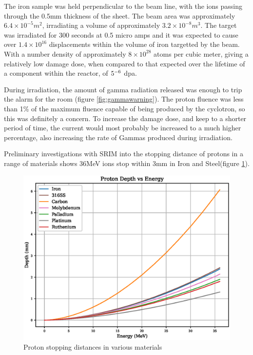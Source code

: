 The iron sample was held perpendicular to the beam line, with the ions passing through the 0.5mm thickness of the sheet.  The beam area was approximately $6.4 \times 10^{-5} m^2$, irradiating a volume of approximately $3.2 \times 10^{-8} m^3$.  The target was irradiated for 300 seconds at 0.5 micro amps and it was expected to cause over $1.4 \times 10^{16}$ displacements within the volume of iron targetted by the beam.  With a number density of approximately $8\times10^{28}$ atoms per cubic meter, giving a relatively low damage dose, when compared to that expected over the lifetime of a component within the reactor, of $5 \time 10^{-6}$ \acrshort{dpa}.

During irradiation, the amount of gamma radiation released was enough to trip the alarm for the room (figure \ref{fig:gammawarning}).  The proton fluence was less than 1\% of the maximum fluence capable of being produced by the cyclotron, so this was definitely a concern.  To increase the damage dose, and keep to a shorter period of time, the current would most probably be increased to a much higher percentage, also increasing the rate of Gammas produced during irradiation.

Preliminary investigations with SRIM into the stopping distance of protons in a range of materials shows 36MeV ions stop within 3mm in Iron and Steel(figure \ref{fig:stoppingdistanceprotons}).

\FloatBarrier
\begin{figure}[h]
  \begin{center}
    \includegraphics[width=0.7\linewidth]{chapters/activity_code/proton_stopping.eps}
    \caption{Proton stopping distances in various materials}
    \label{fig:stoppingdistanceprotons}
  \end{center}
\end{figure}

